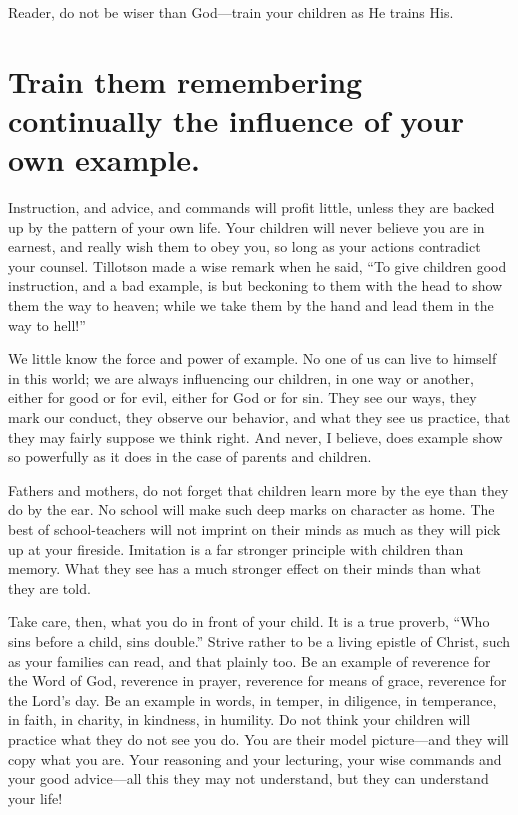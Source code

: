 \documentclass[
]{book}
\begin{document}
Reader, do not be wiser than God---train your children as He trains His.

\hypertarget{train-them-remembering-continually-the-influence-of-your-own-example.}{%
\chapter{Train them remembering continually the influence of your own example.}\label{train-them-remembering-continually-the-influence-of-your-own-example.}}

Instruction, and advice, and commands will profit little, unless they are backed up by the pattern of your own life. Your children will never believe you are in earnest, and really wish them to obey you, so long as your actions contradict your counsel. Tillotson made a wise remark when he said, ``To give children good instruction, and a bad example, is but beckoning to them with the head to show them the way to heaven; while we take them by the hand and lead them in the way to hell!''

We little know the force and power of example. No one of us can live to himself in this world; we are always influencing our children, in one way or another, either for good or for evil, either for God or for sin. They see our ways, they mark our conduct, they observe our behavior, and what they see us practice, that they may fairly suppose we think right. And never, I believe, does example show so powerfully as it does in the case of parents and children.

Fathers and mothers, do not forget that children learn more by the eye than they do by the ear. No school will make such deep marks on character as home. The best of school-teachers will not imprint on their minds as much as they will pick up at your fireside. Imitation is a far stronger principle with children than memory. What they see has a much stronger effect on their minds than what they are told.

Take care, then, what you do in front of your child. It is a true proverb, ``Who sins before a child, sins double.'' Strive rather to be a living epistle of Christ, such as your families can read, and that plainly too. Be an example of reverence for the Word of God, reverence in prayer, reverence for means of grace, reverence for the Lord's day. Be an example in words, in temper, in diligence, in temperance, in faith, in charity, in kindness, in humility. Do not think your children will practice what they do not see you do. You are their model picture---and they will copy what you are. Your reasoning and your lecturing, your wise commands and your good advice---all this they may not understand, but they can understand your life!
\end{document}
